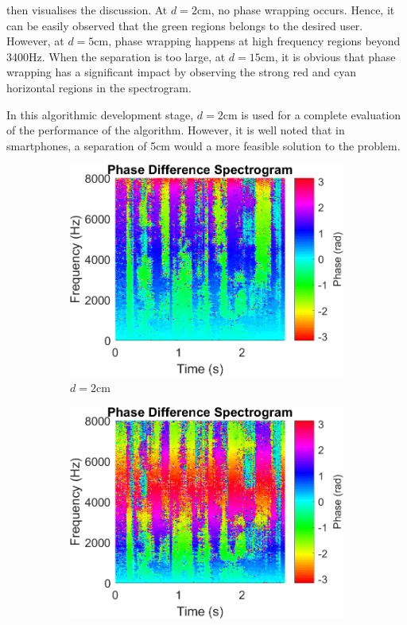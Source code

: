 \documentclass[a4paper,twoside,12pt,hidelinks]{article}
\begin{document}
 then visualises the discussion. At $d=2\text{cm}$, no phase wrapping occurs. Hence, it can be easily observed that the green regions belongs to the desired user. However, at $d=5\text{cm}$, phase wrapping happens at high frequency regions beyond 3400Hz. When the separation is too large, at $d=15\text{cm}$, it is obvious that phase wrapping has a significant impact by observing the strong red and cyan horizontal regions in the spectrogram. 

In this algorithmic development stage, $d=2\text{cm}$ is used for a complete evaluation of the performance of the algorithm. However, it is well noted that in smartphones, a separation of 5cm would a more feasible solution to the problem.
\begin{figure}[H]
\centering	
\begin{subfigure}[H]{0.49\textwidth}
\includegraphics[width=\textwidth]{phasediffspectd2}
\caption{$d=2\text{cm}$}
\end{subfigure}
\begin{subfigure}[H]{0.49\textwidth}
\includegraphics[width=\textwidth]{phasediffspectd5}

\end{subfigure}
\end{figure}
\end{document}
